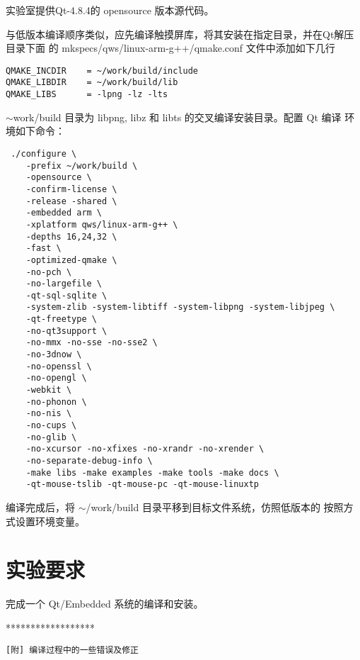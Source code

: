 实验室提供Qt-4.8.4的 opensource 版本源代码。

与低版本编译顺序类似，应先编译触摸屏库，将其安装在指定目录，并在Qt解压目录下面
的 mkspecs/qws/linux-arm-g++/qmake.conf 文件中添加如下几行
\begin{verbatim}
QMAKE_INCDIR    = ~/work/build/include
QMAKE_LIBDIR    = ~/work/build/lib
QMAKE_LIBS      = -lpng -lz -lts
\end{verbatim}

$\sim$work/build 目录为 libpng, libz 和 libts 的交叉编译安装目录。配置 Qt 编译
环境如下命令：

\begin{verbatim}
 ./configure \
    -prefix ~/work/build \
    -opensource \
    -confirm-license \
    -release -shared \
    -embedded arm \
    -xplatform qws/linux-arm-g++ \
    -depths 16,24,32 \
    -fast \
    -optimized-qmake \
    -no-pch \
    -no-largefile \
    -qt-sql-sqlite \
    -system-zlib -system-libtiff -system-libpng -system-libjpeg \
    -qt-freetype \
    -no-qt3support \
    -no-mmx -no-sse -no-sse2 \
    -no-3dnow \
    -no-openssl \
    -no-opengl \
    -webkit \
    -no-phonon \
    -no-nis \
    -no-cups \
    -no-glib \
    -no-xcursor -no-xfixes -no-xrandr -no-xrender \
    -no-separate-debug-info \
    -make libs -make examples -make tools -make docs \
    -qt-mouse-tslib -qt-mouse-pc -qt-mouse-linuxtp
\end{verbatim}

编译完成后，将 $\sim$/work/build 目录平移到目标文件系统，仿照低版本的
按照方式设置环境变量。

\section{实验要求}
完成一个 Qt/Embedded 系统的编译和安装。

\newpage
\begin{center} ****************** \end{center}
\tt [附] 编译过程中的一些错误及修正

